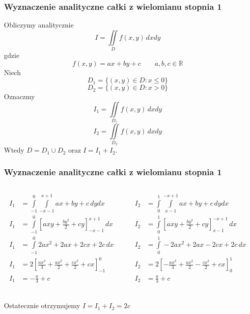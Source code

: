 \documentclass[9pt]{beamer}
\begin{document}
\begin{frame}
\frametitle{Wyznaczenie analityczne całki z wielomianu stopnia 1}

    \begin{spacing}{1}
        Obliczymy analitycznie 
        $$ I = \iint\limits_D f(x,y) \, dx dy $$ 
        gdzie
        $$ f(x,y) = ax + by + c \qquad a,b,c \in \mathbb{R}$$
        Niech 
        $$ D_1 = \{(x,y) \in D : x \leq 0\} $$ 
        $$ D_2 = \{(x,y) \in D : x > 0\} $$ 
        Oznaczmy 
        $$ I_1 = \iint\limits_{D_1} f(x,y) \, dx dy $$ 
        $$ I_2 = \iint\limits_{D_2} f(x,y) \, dx dy $$ 
        Wtedy $ D = D_1 \cup D_2 $ oraz $ I = I_1 + I_2 $.
    \end{spacing}

\end{frame}

\begin{frame}
\frametitle{Wyznaczenie analityczne całki z wielomianu stopnia 1}
    \begin{columns}
        \begin{column}{0.5\textwidth}
            \begin{align*}
                I_1 &= \int\limits_{-1}^{0}\int\limits_{-x-1}^{x+1} ax+by+c \,dydx \\
                I_1 &= \int\limits_{-1}^{0}\left[axy + \frac{by^2}{2} + cy\right]_{-x-1}^{x+1} \,dx \\
                I_1 &= \int\limits_{-1}^{0} 2ax^2 + 2ax + 2cx + 2c \,dx \\
                I_1 &= 2\left[ \frac{ax^3}{3} + \frac{ax^2}{2} + \frac{cx^2}{2} + cx \right]_{-1}^{0} \\
                I_1 &= -\frac{a}{3} + c \\
            \end{align*}
        \end{column}
        \begin{column}{0.5\textwidth}
            \begin{align*}
                I_2 &= \int\limits_{0}^{1}\int\limits_{x-1}^{-x+1} ax+by+c \,dydx \\
                I_2 &= \int\limits_{0}^{1}\left[axy + \frac{by^2}{2} + cy\right]_{x-1}^{-x+1} \,dx \\
                I_2 &= \int\limits_{0}^{1} - 2ax^2 + 2ax - 2cx + 2c \,dx \\
                I_2 &= 2\left[ -\frac{ax^3}{3} + \frac{ax^2}{2} - \frac{cx^2}{2} + cx \right]_{0}^{1} \\
                I_2 &= \frac{a}{3} + c \\
            \end{align*}
        \end{column}
    \end{columns}

    \begin{center}
        Ostatecznie otrzymujemy $ I = I_1 + I_2 = 2c $
    \end{center}
\end{frame}
\end{document}
